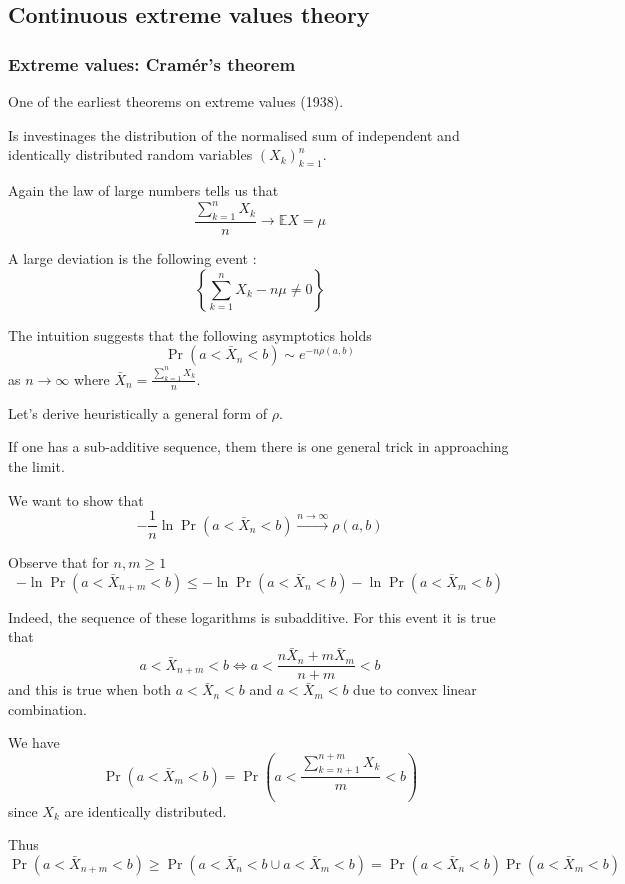 \documentclass[a4paper]{article}
\newcommand{\obj}[1]{{\left\{ #1 \right \}}}
\newcommand{\brac}[1]{{\left ( #1 \right )}}
\newcommand{\ex}{\mathbb{E}}
\begin{document}


\subsection{Continuous extreme values theory} %
\label{sub:continuous_extreme_values_theory}

\subsubsection{Extreme values: Cram\'er's theorem} %
\label{ssub:extreme_values_cramer_theorem}

One of the earliest theorems on extreme values (1938).

Is investinages the distribution of the normalised sum of independent and identically distributed random variables $\brac{X_k}_{k=1}^n$.

Again the law of large numbers tells us that
\[\frac{\sum_{k=1}^n X_k}{n} \to \ex X = \mu\]

A large deviation is the following event :
\[\obj{ \sum_{k=1}^n X_k - n\mu \neq 0 }\]

The intuition suggests that the following asymptotics holds
\[\Pr\brac{a < \bar{X}_n < b} \sim e^{-n \rho(a,b)}\] as $n \to \infty$ where $\bar{X}_n = \frac{\sum_{k=1}^n X_k}{n}$.

Let's derive heuristically a general form of $\rho$.

If one has a sub-additive sequence, them there is one general trick in approaching the limit.

We want to show that 
\[-\frac{1}{n}\ln \Pr(a<\bar{X}_n<b) \overset{n\to\infty}{\to} \rho(a,b)\]

Observe that for $n,m\geq 1$
\[-\ln \Pr(a<\bar{X}_{n+m}<b) \leq - \ln \Pr(a<\bar{X}_n<b) - \ln \Pr(a<\bar{X}_m<b)\]

Indeed, the sequence of these logarithms is subadditive.
For this event it is true that
\[a<\bar{X}_{n+m}<b \Leftrightarrow a<\frac{n \bar{X}_n + m \bar{X}_m}{n+m}<b \]
and this is true when both $a<\bar{X}_n<b$ and $a<\bar{X}_m<b$ due to convex linear combination.

We have 
\[\Pr\brac{a<\bar{X}_m<b} = \Pr\brac{a<\frac{\sum_{k=n+1}^{n+m}X_k}{m}<b}\]
since $X_k$ are identically distributed.

Thus 
\[\Pr\brac{a<\bar{X}_{n+m}<b} \geq \Pr\brac{a<\bar{X}_n<b \cup a<\bar{X}_m<b} = \Pr\brac{a<\bar{X}_n<b}\Pr\brac{a<\bar{X}_m<b} \]
\end{document}
